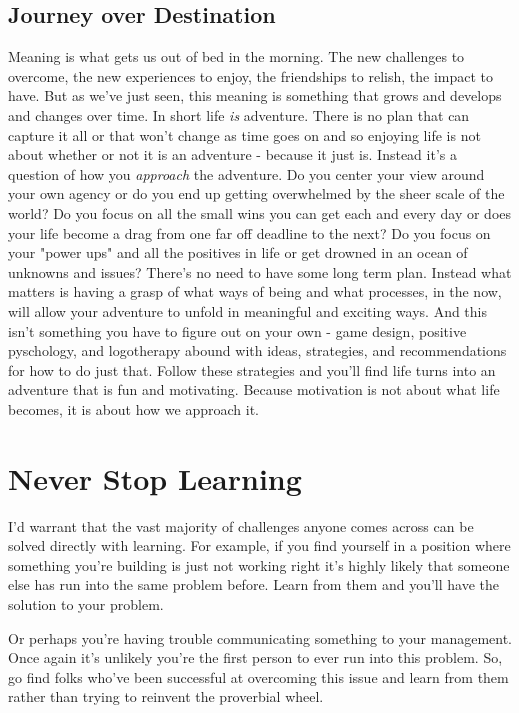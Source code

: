 \documentclass[11pt]{book}
\begin{document}
\section{Journey over Destination}
Meaning is what gets us out of bed in the morning. The new challenges to overcome, the new experiences to enjoy, the friendships to relish, the impact to have. But as we've just seen, this meaning is something that grows and develops and changes over time. In short life \textit{is} adventure. There is no plan that can capture it all or that won't change as time goes on and so enjoying life is not about whether or not it is an adventure - because it just is. Instead it's a question of how you \textit{approach} the adventure. Do you center your view around your own agency or do you end up getting overwhelmed by the sheer scale of the world? Do you focus on all the small wins you can get each and every day or does your life become a drag from one far off deadline to the next? Do you focus on your "power ups" and all the positives in life or get drowned in an ocean of unknowns and issues? There's no need to have some long term plan. Instead what matters is having a grasp of what ways of being and what processes, in the now, will allow your adventure to unfold in meaningful and exciting ways. And this isn't something you have to figure out on your own - game design, positive pyschology, and logotherapy abound with ideas, strategies, and recommendations for how to do just that. Follow these strategies and you'll find life turns into an adventure that is fun and motivating. Because motivation is not about what life becomes, it is about how we approach it.

\chapter{Never Stop Learning}
I'd warrant that the vast majority of challenges anyone comes across can be solved directly with learning. For example, if you find yourself in a position where something you're building is just not working right it's highly likely that someone else has run into the same problem before. Learn from them and you'll have the solution to your problem. 
\newline

Or perhaps you're having trouble communicating something to your management. Once again it's unlikely you're the first person to ever run into this problem. So, go find folks who've been successful at overcoming this issue and learn from them rather than trying to reinvent the proverbial wheel. 
\newline
\end{document}
